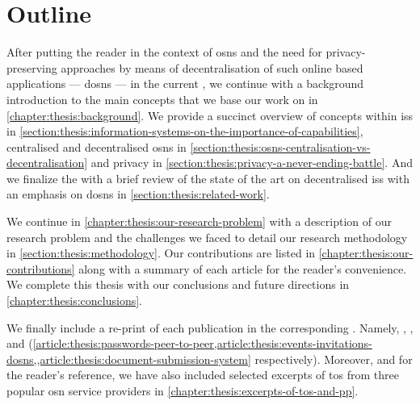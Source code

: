 \section{Outline}
    \label{section:thesis:outline}
After putting the reader in the context of \acp{osn} and the need for privacy-preserving 
approaches by means of decentralisation of such online based applications --- \acp{dosn} 
--- in the current , we continue with a background 
introduction to the main concepts that we base our work on in \cref{chapter:thesis:background}. 
We provide a succinct overview of concepts within \acp{is} in \cref{section:thesis:information-systems-on-the-importance-of-capabilities}, 
centralised and decentralised \acp{osn} in \cref{section:thesis:osns-centralisation-vs-decentralisation} 
and privacy in \cref{section:thesis:privacy-a-never-ending-battle}. And we finalize 
the  with a brief review of the state of the art 
on decentralised \acp{is} with an emphasis on \acp{dosn} in \cref{section:thesis:related-work}.

We continue in \cref{chapter:thesis:our-research-problem} with a description of our research 
problem and the challenges we faced to detail our research methodology in \cref{section:thesis:methodology}. 
Our contributions are listed in \cref{chapter:thesis:our-contributions} along with 
a summary of each article for the reader's convenience. We complete this thesis 
with our conclusions and future directions in \cref{chapter:thesis:conclusions}.

We finally include a re-print of each publication in the corresponding . 
Namely, , , 
and  (\cref{article:thesis:passwords-peer-to-peer,article:thesis:events-invitations-dosns,,article:thesis:document-submission-system} 
respectively). Moreover, and for the reader's reference, we have also included selected 
excerpts of \ac{tos} from three popular \ac{osn} service providers in \cref{chapter:thesis:excerpts-of-tos-and-pp}.


